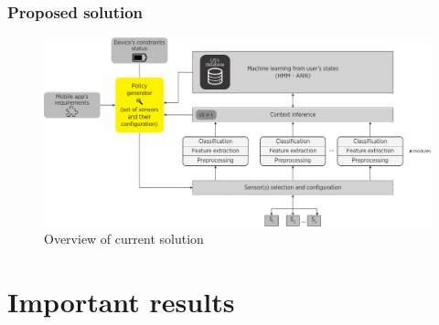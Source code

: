 \documentclass[compress,9pt,xcolor={dvipsnames,table}]{beamer}
\begin{document}
\begin{frame}[t]
\end{frame}

\begin{frame}[t]\frametitle{Proposed solution}
\begin{figure}[tb]
  \centering
  \includegraphics[width=\textwidth]{../../../resources/images/vectors/policy-manager-incorporation}
  \caption{Overview of current solution}
  \label{fig:solution}
\end{figure}
\end{frame}


\section{Important results}
\end{document}
